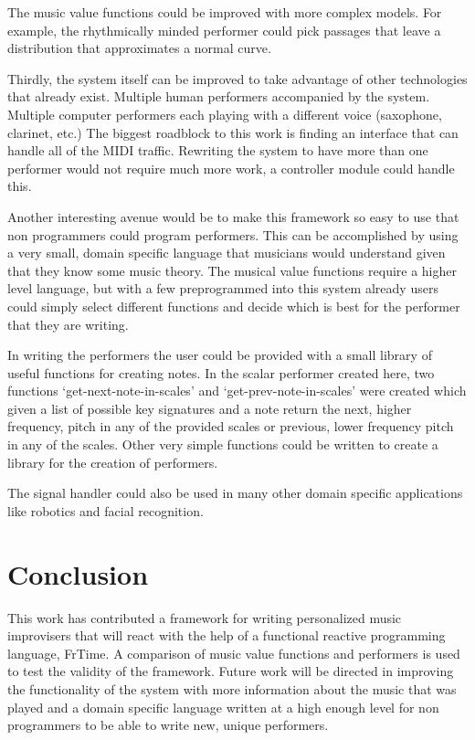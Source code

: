 \documentclass[12pt]{ucthesis}
\begin{document}
The music value functions could be improved with more complex models. For example, the rhythmically minded performer could pick passages that leave a distribution that approximates a normal curve. 

Thirdly, the system itself can be improved to take advantage of other technologies that already exist. Multiple human performers accompanied by the system. Multiple computer performers each playing with a different voice (saxophone, clarinet, etc.) The biggest roadblock to this work is finding an interface that can handle all of the MIDI traffic. Rewriting the system to have more than one performer would not require much more work, a controller module could handle this. 

Another interesting avenue would be to make this framework so easy to use that non programmers could program performers. This can be accomplished by using a very small, domain specific language that musicians would understand given that they know some music theory. The musical value functions require a higher level language, but with a few preprogrammed into this system already users could simply select different functions and decide which is best for the performer that they are writing. 

In writing the performers the user could be provided with a small library of useful functions for creating notes. In the scalar performer created here, two functions `get-next-note-in-scales' and `get-prev-note-in-scales' were created which given a list of possible key signatures and a note return the next, higher frequency, pitch in any of the provided scales or previous, lower frequency pitch in any of the scales. Other very simple functions could be written to create a library for the creation of performers. 

The signal handler could also be used in many other domain specific applications like robotics and facial recognition. 

\chapter{Conclusion}
\label{conclusion}

This work has contributed a framework for writing personalized music improvisers that will react with the help of a functional reactive programming language, FrTime. A comparison of music value functions and performers is used to test the validity of the framework. Future work will be directed in improving the functionality of the system with more information about the music that was played and a domain specific language written at a high enough level for non programmers to be able to write new, unique performers.



\clearpage


\end{document}

